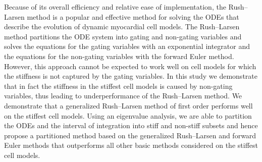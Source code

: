 \documentclass[landscape,a0b,final]{a0poster}
\newenvironment{poster}{
  \begin{center}
  \begin{minipage}[c]{0.98\textwidth}
}{
  \end{minipage} 
  \end{center}
}
\newenvironment{pcolumn}[1]{
  \begin{minipage}{#1\textwidth}
  \begin{center}
}{
  \end{center}
  \end{minipage}
}
\newcommand{\pbox}[4]{
\psshadowbox[#3]{
\begin{minipage}[t][#2][t]{#1}
#4
\end{minipage}
}}
\begin{document}
\begin{poster}
\begin{center}
\begin{pcolumn}{0.24}
{%



\begin{center}\pbox{0.8\textwidth}{}{linewidth=1mm,framearc=0.1,linecolor=black,fillstyle=gradient,gradangle=0,gradbegin=lightUofSgreen,gradend=lightUofSgreen2,gradmidpoint=1.0,framesep=1em}{\begin{center}\sc \textcolor{white}{\Large{Conclusion}}\end{center}}\end{center}
\vspace{0.4cm}

Because of its overall efficiency and relative ease of implementation,
the Rush--Larsen method is a popular and effective method for solving
the ODEs that describe the evolution of dynamic myocardial cell
models. The Rush--Larsen method partitions the ODE system into gating
and non-gating variables and solves the equations for the gating
variables with an exponential integrator and the equations for the
non-gating variables with the forward Euler method. However, this
approach cannot be expected to work well on cell models for which the
stiffness is not captured by the gating variables. In this study we
demonstrate that in fact the stiffness in the stiffest cell models is
caused by non-gating variables, thus leading to underperformance of
the Rush--Larsen method. We demonstrate that a generalized
Rush--Larsen method of first order performs well on the stiffest cell
models. Using an eigenvalue analysis, we are able to partition the
ODEs and the interval of integration into stiff and non-stiff subsets
and hence propose a partitioned method based on the generalized
Rush--Larsen and forward Euler methods that outperforms all other
basic methods considered on the stiffest cell models.

{\footnotesize

%
}

}
\end{pcolumn}
\end{center}

\vspace*{2cm}


\end{poster}
\end{document}
